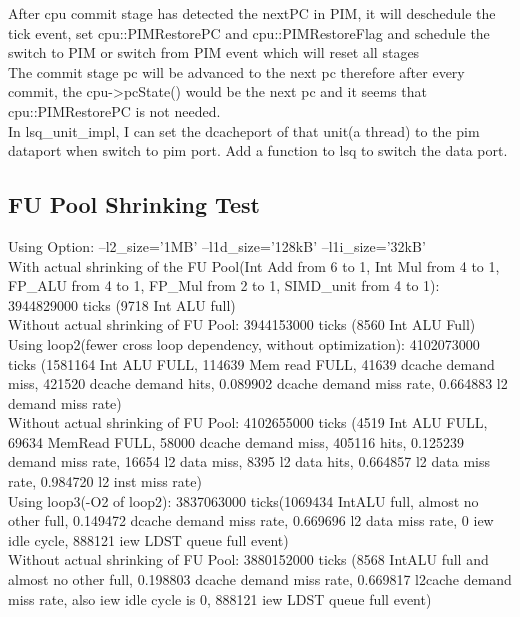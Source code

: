 \documentclass[11pt]{article}
\begin{document}
After cpu commit stage has detected the nextPC in PIM, it will deschedule the tick event, set cpu::PIMRestorePC and cpu::PIMRestoreFlag and schedule the switch to PIM or switch from PIM event which will reset all stages\\

The commit stage pc will be advanced to the next pc therefore after every commit, the cpu->pcState() would be the next pc and it seems that cpu::PIMRestorePC is not needed.\\

In lsq\_unit\_impl, I can set the dcacheport of that unit(a thread) to the pim dataport when switch to pim port. Add a function to lsq to switch the data port.\\

\subsection{FU Pool Shrinking Test}
Using Option: --l2\_size='1MB' --l1d\_size='128kB' --l1i\_size='32kB'\\

With actual shrinking of the FU Pool(Int Add from 6 to 1, Int Mul from 4 to 1, FP\_ALU from 4 to 1, FP\_Mul from 2 to 1, SIMD\_unit from 4 to 1): 3944829000 ticks (9718 Int ALU full)\\

Without actual shrinking of FU Pool: 3944153000 ticks (8560 Int ALU Full)\\

Using loop2(fewer cross loop dependency, without optimization): 4102073000 ticks (1581164 Int ALU FULL, 114639 Mem read FULL, 41639 dcache demand miss, 421520 dcache demand hits, 0.089902 dcache demand miss rate, 0.664883 l2 demand miss rate)\\

Without actual shrinking of FU Pool: 4102655000 ticks (4519 Int ALU FULL, 69634 MemRead FULL, 58000 dcache demand miss, 405116 hits, 0.125239  demand miss rate, 16654 l2 data miss, 8395 l2 data hits, 0.664857 l2 data miss rate, 0.984720 l2 inst miss rate)\\

Using loop3(-O2 of loop2): 3837063000 ticks(1069434 IntALU full, almost no other full, 0.149472 dcache demand miss rate, 0.669696 l2 data miss rate, 0 iew idle cycle, 888121 iew LDST queue full event)\\

Without actual shrinking of FU Pool: 3880152000 ticks (8568 IntALU full and almost no other full, 0.198803 dcache demand miss rate, 0.669817 l2cache demand miss rate, also iew idle cycle is 0, 888121 iew LDST queue full event)\\
\end{document}
